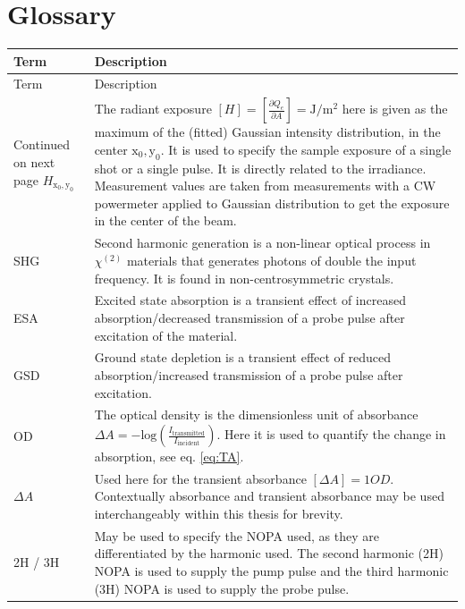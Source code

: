 \documentclass[twoside,openright,listof=numbered]{scrreprt}
\def\radiantExp{\ensuremath{H_\mathrm{x_0,y_0}}}
\begin{document}


\chapter{Glossary}

\begin{longtable}{p{}p{}}
    \toprule 
    Term & Description \\
    \midrule
    \endfirsthead
    \toprule 
    Term & Description \\
    \midrule
    \endhead
    \midrule
    Continued on next page
    \endfoot
    \bottomrule
    \endlastfoot
\radiantExp & The radiant exposure $[H] = [\frac{\partial Q_e}{\partial A}] = \si{\joule\per\square\meter}$ here is given as the maximum of the (fitted) Gaussian intensity distribution, in the center $\mathrm{x_0,y_0}$. It is used to specify the sample exposure of a single shot or a single pulse. It is directly related to the irradiance. Measurement values are taken from measurements with a CW powermeter applied to Gaussian distribution to get the exposure in the center of the beam.\\
SHG & Second harmonic generation is a non-linear optical process in $\chi^{\left(2\right)}$ materials that generates photons of double the input frequency. It is found in non-centrosymmetric crystals.\\
ESA & Excited state absorption is a transient effect of increased absorption/decreased transmission of a probe pulse after excitation of the material.\\
GSD & Ground state depletion is a transient effect of reduced absorption/increased transmission of a probe pulse after excitation.\\
OD & The optical density is the dimensionless unit of absorbance $\Delta A = -\text{log}\left(\frac{I_\text{transmitted}}{I_\text{incident}}\right)$. Here it is used to quantify the change in absorption, see eq. \ref{eq:TA}.\\
$\Delta A$& Used here for the transient absorbance $[\Delta A] = 1 OD$. Contextually absorbance and transient absorbance may be used interchangeably within this thesis for brevity.\\
2H / 3H & May be used to specify the NOPA used, as they are differentiated by the harmonic used. The second harmonic (2H) NOPA is used to supply the pump pulse and the third harmonic (3H) NOPA is used to supply the probe pulse.\\
\bottomrule
\end{longtable}
\end{document}

